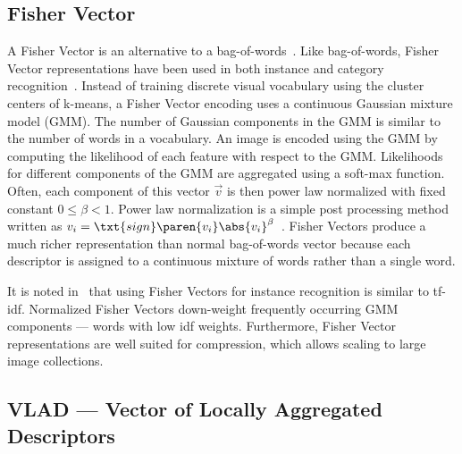     \subsection{Fisher Vector}
        A Fisher Vector is an alternative to a bag-of-words~\cite{perronnin_largescale_2010-1, jegou_aggregating_2010}.
        Like bag-of-words, Fisher Vector representations have been used in both instance and category
        recognition~\cite{perronnin_fisher_2007, cinbis_image_2012, sun_largescale_2013, sanchez_image_2013,
        juneja_blocks_2013, douze_combining_2011, ma_local_2012, murray_generalized_2014, gosselin_revisiting_2014}.
        Instead of training discrete visual vocabulary using the cluster centers of k-means, a Fisher Vector encoding
        uses a continuous Gaussian mixture model (GMM). The number of Gaussian components in the GMM is  similar to the
        number of words in a vocabulary. An image is encoded using the GMM by computing the likelihood of each feature
        with respect to the GMM{}. Likelihoods for different components of the GMM are aggregated using a soft-max
        function. Often, each component of this vector $\vec{v}$ is then power law normalized with fixed constant $0
        \leq \beta < 1$. Power law normalization is a simple post processing method written as $v_i =
        \txt{sign}\paren{v_i}\abs{v_i}^\beta$~\cite{jegou_aggregating_2012}. Fisher Vectors produce a much richer
        representation than normal bag-of-words vector because each descriptor is assigned to a continuous mixture of
        words rather than a single word.

        It is noted in~\cite{perronnin_largescale_2010-1} that using Fisher Vectors for instance recognition is similar
        to tf-idf. Normalized Fisher Vectors down-weight frequently occurring GMM components --- \ie{} words with low
        idf weights. Furthermore, Fisher Vector representations are well suited for compression, which allows scaling to
        large image collections.

    \subsection{VLAD --- Vector of Locally Aggregated Descriptors} 

